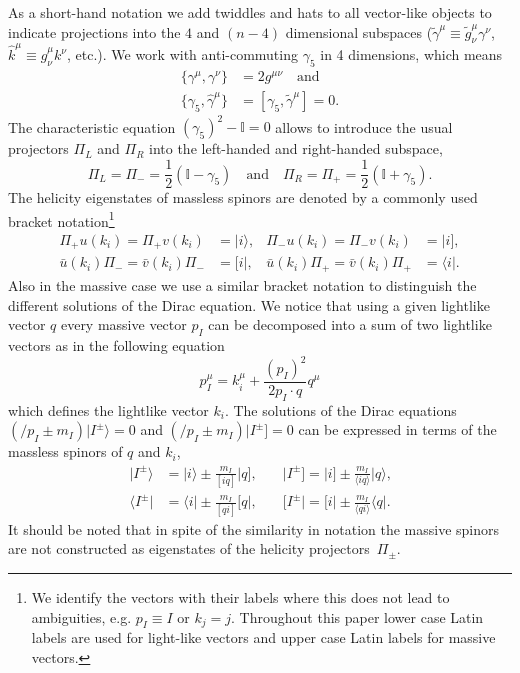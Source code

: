 \documentclass[preprint,number,12pt,sort&compress]{elsarticle}
\newcommand{\fmslash}[1]{\ensuremath{/\!\!\!{#1}}}
\newcommand{\pslash}[1][{}]{\fmslash{p}_{#1}}
\newcommand{\bra}[1]{\langle #1 \vert}
\newcommand{\brb}[1]{[ #1 \vert}
\newcommand{\kea}[1]{\vert #1 \rangle}
\newcommand{\keb}[1]{\vert #1 ]}
\newcommand{\Spaa}[1]{\langle #1 \rangle}
\newcommand{\Spbb}[1]{[ #1 ]}
\newcommand{\One}{{\mathbb{I}}}
\begin{document}
As a short-hand notation we add twiddles and hats to all vector-like
objects to indicate projections into the $4$ and $(n-4)$ dimensional
subspaces ($\tilde{\gamma}^\mu\equiv\tilde{g}^\mu_\nu\gamma^\nu$,
$\hat{k}^\mu\equiv\hat{g}^\mu_\nu k^\nu$, etc.). We work with
anti-commuting $\gamma_5$ in 4 dimensions, which means
\begin{subequations}\label{eq:tHoofAlgebra}
\begin{align}
\{\gamma^\mu,\gamma^\nu\}&=2g^{\mu\nu}\quad\text{and}\\
\{\gamma_5,\hat{\gamma}^\mu\}&=[\gamma_5,\tilde{\gamma}^\mu]=0\text{.}
\end{align}
\end{subequations}
The characteristic equation $(\gamma_5)^2-\One=0$ allows to introduce
the usual projectors $\Pi_L$ and $\Pi_R$ into the left-handed and
right-handed subspace,
\begin{equation}
\Pi_L=\Pi_-=\frac12\left(\One-\gamma_5\right)\quad\text{and}\quad%
\Pi_R=\Pi_+=\frac12\left(\One+\gamma_5\right)\text{.}
\end{equation}
The helicity eigenstates of massless spinors are denoted by a commonly used
bracket notation\footnote{We identify the vectors with their labels where
this does not lead to ambiguities, e.g. $p_I\equiv I$ or $k_j=j$. Throughout
this paper lower case Latin labels are used for light-like vectors and
upper case Latin labels for massive vectors.}
\begin{subequations}
\begin{align}
\Pi_+u(k_i)=\Pi_+v(k_i)&=\kea{i},&\Pi_-u(k_i)=\Pi_-v(k_i)&=\keb{i},\\
\bar{u}(k_i)\Pi_-=\bar{v}(k_i)\Pi_-&=\brb{i},&%
\bar{u}(k_i)\Pi_+=\bar{v}(k_i)\Pi_+&=\bra{i}.
\end{align}
\end{subequations}
Also in the massive case we use a similar bracket notation to distinguish the
different solutions of the Dirac equation.
We notice that using a given lightlike vector $q$ every massive
vector $p_I$ can be decomposed into a sum of two lightlike vectors
as in the following equation
\begin{equation}\label{eq:lcvectors}
p_I^\mu=k_i^\mu+\frac{(p_I)^2}{2p_I\cdot q}q^\mu
\end{equation}
which defines the lightlike vector $k_i$. 
The solutions of the Dirac equations
$(\pslash[I]\pm m_I)\kea{I^\pm}=0$ and $(\pslash[I]\pm m_I)\keb{I^\pm}=0$
can be expressed in terms of the massless spinors of $q$ and $k_i$,
\begin{subequations}\label{eq:lcspinors}
\begin{align}
\kea{I^\pm}&=\kea{i}\pm\frac{m_I}{\Spbb{iq}}\keb{q},\quad
&\keb{I^\pm}=\keb{i}\pm\frac{m_I}{\Spaa{iq}}\kea{q}\text{,}\\
\bra{I^\pm}&=\bra{i}\pm\frac{m_I}{\Spbb{qi}}\brb{q},\quad
&\brb{I^\pm}=\brb{i}\pm\frac{m_I}{\Spaa{qi}}\bra{q}.
\end{align}
\end{subequations}
It should be noted that in spite of the similarity in notation the
massive spinors are not constructed as eigenstates of the helicity
projectors~$\Pi_\pm$.
\end{document}
